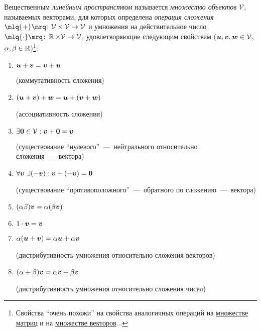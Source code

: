 \documentclass[a4paper,12pt]{article}
\begin{document}
  Вещественным \emph{линейным пространством} называется \emph{множество объектов} $\mathcal V$, называемых векторами, для которых определена \emph{операция сложения} $\mlq{+}\mrq\colon \mathcal V \hm\times \mathcal V \hm\to \mathcal V$ и умножения на действительное число $\mlq{\cdot}\mrq\colon \RR \hm\times \mathcal V \hm\to \mathcal V$, удовлетворяющие следующим свойствам ($\bds u, \bds v, \bds w \hm\in \mathcal V$, $\alpha, \beta \hm\in \RR$)\footnote{Свойства ``очень похожи'' на свойства аналогичных операций на \href{https://github.com/Alvant/GeomeSeminare/blob/master2022/seminars/geome/seminar01}{множестве матриц} и на \href{https://github.com/Alvant/GeomeSeminare/tree/master2022/seminars/geome/seminar02}{множестве векторов}...}:
  \begin{enumerate}
    \item $\boldsymbol u + \boldsymbol v = \boldsymbol v + \boldsymbol u$
    
    (коммутативность сложения)
    
    \item $(\boldsymbol u + \boldsymbol v) + \boldsymbol w = \boldsymbol u + (\boldsymbol v + \boldsymbol w)$
    
    (ассоциативность сложения)
    
    \item $\exists \boldsymbol 0 \in \mathcal V: \boldsymbol v + \boldsymbol 0 = \boldsymbol v$
    
    (существование ``нулевого''~---~нейтрального относительно сложения~---~вектора)
    
    \item $\forall \boldsymbol v\ \exists (-{\boldsymbol v}): \boldsymbol v + (-{\boldsymbol v}) = \boldsymbol 0$
    
    (существование ``противоположного''~---~обратного по сложению~---~вектора)
    
    \item $(\alpha \beta) \boldsymbol v = \alpha (\beta \boldsymbol v)$
    \item $1 \cdot \boldsymbol v = \boldsymbol v$
    \item $\alpha (\boldsymbol u + \boldsymbol v) = \alpha \boldsymbol u + \alpha \boldsymbol v$
    
    (дистрибутивность умножения относительно сложения векторов)
    
    \item $(\alpha + \beta) \boldsymbol v = \alpha \boldsymbol v + \beta \boldsymbol v$
    
    (дистрибутивность умножения относительно сложения чисел)
  \end{enumerate}
  
  \newpage
  
\end{document}
